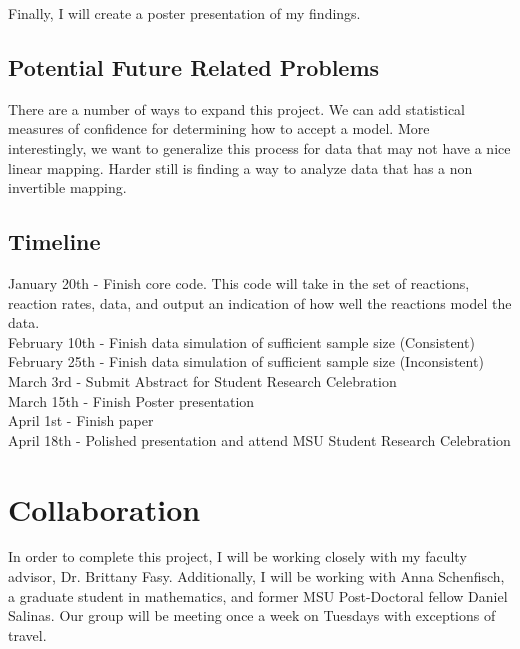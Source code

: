 \documentclass[10.5pt]{article}
\begin{document}
Finally, I will create a poster presentation of my findings.
\subsection{Potential Future Related Problems}
There are a number of ways to expand this project. We can add statistical measures of confidence for determining how to accept a model. More interestingly, we want to generalize this process for data that may not have a nice linear mapping. Harder still is finding a way to analyze data that has a non invertible mapping. 
\subsection{Timeline}
January 20th - Finish core code. This code will take in the set of reactions, reaction rates, data, and output an indication of how well the reactions model the data. \\
February 10th - Finish data simulation of sufficient sample size (Consistent)\\
February 25th - Finish data simulation of sufficient sample size (Inconsistent)\\
March 3rd - Submit Abstract for Student Research Celebration\\
March 15th - Finish Poster presentation\\
April 1st - Finish paper\\
April 18th - Polished presentation and attend MSU Student Research Celebration

\section{Collaboration}
In order to complete this project, I will be working closely with my faculty advisor, Dr. Brittany Fasy. Additionally, I will be working with Anna Schenfisch, a graduate student in mathematics, and former MSU Post-Doctoral fellow Daniel Salinas. Our group will be meeting once a week on Tuesdays with exceptions of travel. 
\end{document}
